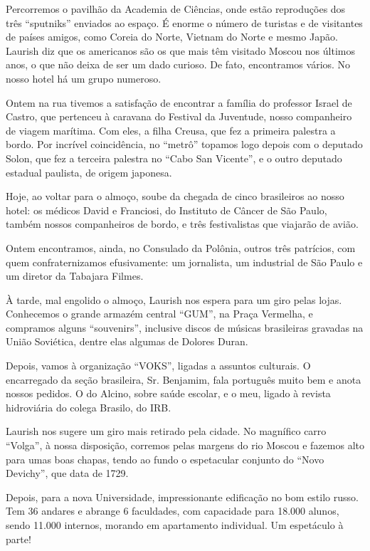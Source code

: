 Percorremos o pavilhão da Academia de Ciências, onde estão reproduções dos três ``sputniks'' enviados ao espaço. É enorme o número de turistas e de visitantes de países amigos, como Coreia do Norte, Vietnam do Norte e mesmo Japão. Laurish diz que os americanos são os que mais têm visitado Moscou nos últimos anos, o que não deixa de ser um dado curioso. De fato, encontramos vários. No nosso hotel há um grupo numeroso.

Ontem na rua tivemos a satisfação de encontrar a família do professor Israel de Castro, que pertenceu à caravana do Festival da Juventude, nosso companheiro de viagem marítima. Com eles, a filha Creusa, que fez a primeira palestra a bordo. Por incrível coincidência, no ``metrô'' topamos logo depois com o deputado Solon, que fez a terceira palestra no ``Cabo San Vicente'', e o outro deputado estadual paulista, de origem japonesa.

Hoje, ao voltar para o almoço, soube da chegada de cinco brasileiros ao nosso hotel: os médicos David e Franciosi, do Instituto de Câncer de São Paulo, também nossos companheiros de bordo, e três festivalistas que viajarão de avião.

Ontem encontramos, ainda, no Consulado da Polônia, outros três patrícios, com quem confraternizamos efusivamente: um jornalista, um industrial de São Paulo e um diretor da Tabajara Filmes.

À tarde, mal engolido o almoço, Laurish nos espera para um giro pelas lojas. Conhecemos o grande armazém central ``GUM'', na Praça Vermelha, e compramos alguns ``souvenirs'', inclusive discos de músicas brasileiras gravadas na União Soviética, dentre elas algumas de Dolores Duran.

Depois, vamos à organização ``VOKS'', ligadas a assuntos culturais. O encarregado da seção brasileira, Sr. Benjamim, fala português muito bem e anota nossos pedidos. O do Alcino, sobre saúde escolar, e o meu, ligado à revista hidroviária do colega Brasilo, do IRB.

Laurish nos sugere um giro mais retirado pela cidade. No magnífico carro ``Volga'', à nossa disposição, corremos pelas margens do rio Moscou e fazemos alto para umas boas chapas, tendo ao fundo o espetacular conjunto do ``Novo Devichy'', que data de 1729.

Depois, para a nova Universidade, impressionante edificação no bom estilo russo. Tem 36 andares e abrange 6 faculdades, com capacidade para 18.000 alunos, sendo 11.000 internos, morando em apartamento individual. Um espetáculo à parte!


